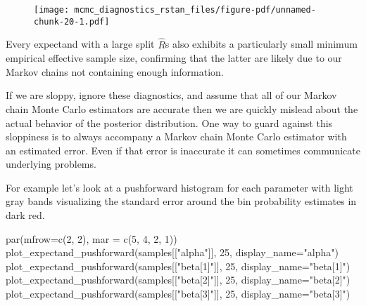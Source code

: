 \documentclass[
  letterpaper,
  DIV=11,
  numbers=noendperiod]{scrartcl}
\newenvironment{Shaded}{\begin{snugshade}}{\end{snugshade}}
\newcommand{\AttributeTok}[1]{\textcolor[rgb]{0.40,0.45,0.13}{#1}}
\newcommand{\DecValTok}[1]{\textcolor[rgb]{0.68,0.00,0.00}{#1}}
\newcommand{\FunctionTok}[1]{\textcolor[rgb]{0.28,0.35,0.67}{#1}}
\newcommand{\NormalTok}[1]{\textcolor[rgb]{0.00,0.23,0.31}{#1}}
\newcommand{\StringTok}[1]{\textcolor[rgb]{0.13,0.47,0.30}{#1}}
\begin{document}
\begin{figure}[H]

{\centering \texttt{[image: mcmc\_diagnostics\_rstan\_files/figure-pdf/unnamed-chunk-20-1.pdf]}

}

\end{figure}

Every expectand with a large split \(\hat{R}\)s also exhibits a
particularly small minimum empirical effective sample size, confirming
that the latter are likely due to our Markov chains not containing
enough information.

If we are sloppy, ignore these diagnostics, and assume that all of our
Markov chain Monte Carlo estimators are accurate then we are quickly
mislead about the actual behavior of the posterior distribution. One way
to guard against this sloppiness is to always accompany a Markov chain
Monte Carlo estimator with an estimated error. Even if that error is
inaccurate it can sometimes communicate underlying problems.

For example let's look at a pushforward histogram for each parameter
with light gray bands visualizing the standard error around the bin
probability estimates in dark red.

\begin{Shaded}
\begin{Highlighting}[]
\FunctionTok{par}\NormalTok{(}\AttributeTok{mfrow=}\FunctionTok{c}\NormalTok{(}\DecValTok{2}\NormalTok{, }\DecValTok{2}\NormalTok{), }\AttributeTok{mar =} \FunctionTok{c}\NormalTok{(}\DecValTok{5}\NormalTok{, }\DecValTok{4}\NormalTok{, }\DecValTok{2}\NormalTok{, }\DecValTok{1}\NormalTok{))}
\FunctionTok{plot\_expectand\_pushforward}\NormalTok{(samples[[}\StringTok{"alpha"}\NormalTok{]], }\DecValTok{25}\NormalTok{, }
                           \AttributeTok{display\_name=}\StringTok{"alpha"}\NormalTok{)}
\FunctionTok{plot\_expectand\_pushforward}\NormalTok{(samples[[}\StringTok{"beta[1]"}\NormalTok{]], }\DecValTok{25}\NormalTok{, }
                           \AttributeTok{display\_name=}\StringTok{"beta[1]"}\NormalTok{)}
\FunctionTok{plot\_expectand\_pushforward}\NormalTok{(samples[[}\StringTok{"beta[2]"}\NormalTok{]], }\DecValTok{25}\NormalTok{, }
                           \AttributeTok{display\_name=}\StringTok{"beta[2]"}\NormalTok{)}
\FunctionTok{plot\_expectand\_pushforward}\NormalTok{(samples[[}\StringTok{"beta[3]"}\NormalTok{]], }\DecValTok{25}\NormalTok{, }
                           \AttributeTok{display\_name=}\StringTok{"beta[3]"}\NormalTok{)}
\end{Highlighting}
\end{Shaded}
\end{document}
